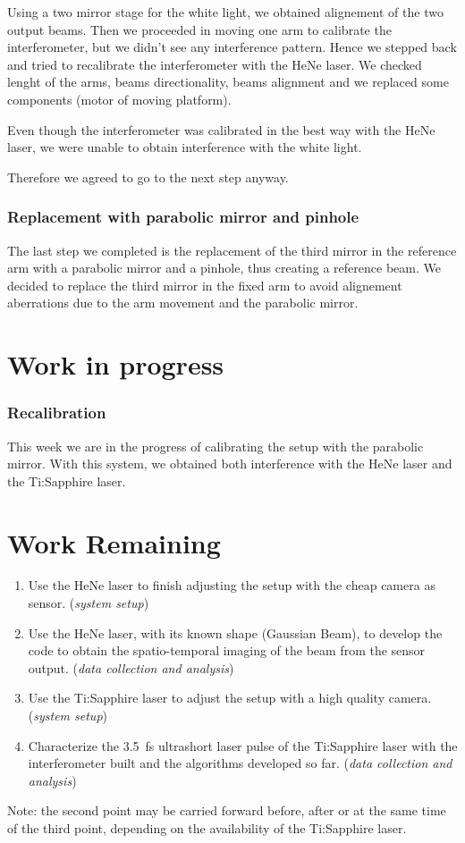 \documentclass[12pt,a4paper]{report}
\begin{document}
Using a two mirror stage for the white light, we obtained alignement of the two output beams.
Then we proceeded in moving one arm to calibrate the interferometer, but we didn't see any interference pattern.
Hence we stepped back and tried to recalibrate the interferometer with the HeNe laser.
We checked lenght of the arms, beams directionality, beams alignment and we replaced some components (motor of moving platform).

Even though the interferometer was calibrated in the best way with the HeNe laser, we were unable to obtain interference with the white light.

Therefore we agreed to go to the next step anyway.

\subsubsection*{Replacement with parabolic mirror and pinhole}
The last step we completed is the replacement of the third mirror in the reference arm with a parabolic mirror and a pinhole, thus creating a reference beam.
We decided to replace the third mirror in the fixed arm to avoid alignement aberrations due to the arm movement and the parabolic mirror.


\section*{Work in progress}
\subsubsection*{Recalibration}
This week we are in the progress of calibrating the setup with the parabolic mirror.
With this system, we obtained both interference with the HeNe laser and the Ti:Sapphire laser.

\section*{Work Remaining}
\begin{enumerate}
\item Use the HeNe laser to finish adjusting the setup with the cheap camera as sensor. (\textit{system setup})
\item Use the HeNe laser, with its known shape (Gaussian Beam), to develop the code to obtain the spatio-temporal imaging of the beam from the sensor output. (\textit{data collection and analysis})
\item Use the Ti:Sapphire laser to adjust the setup with a high quality camera. (\textit{system setup})
\item Characterize the \SI{3.5}{\fs} ultrashort laser pulse of the Ti:Sapphire laser with the interferometer built and the algorithms developed so far. (\textit{data collection and analysis})
\end{enumerate}
Note: the second point may be carried forward before, after or at the same time of the third point, depending on the availability of the Ti:Sapphire laser.
\end{document}
